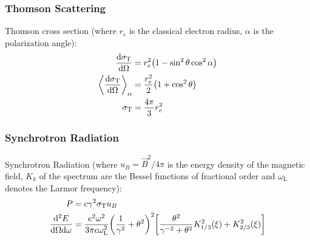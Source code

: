 		\subsubsection{Thomson Scattering}
			Thomson cross section (where $r_e$ is the classical electron radius, $\alpha$ is the polarization angle):
			\begin{equation}
				\begin{aligned}
					\dv{\sigma_\text{T}}{\Omega} &= r_e^2 \qty(1-\sin^2 \theta \cos^2 \alpha) \\
					\left\langle \dv{\sigma_\text{T}}{\Omega} \right\rangle_{\alpha} &= \frac{r_e^2}{2} \qty(1+\cos^2 \theta) \\
					\sigma_\text{T} &= \frac{4\pi}{3}r_e^2 \\
				\end{aligned}
			\end{equation}

		\subsubsection{Synchrotron Radiation}
			\noindent
			Synchrotron Radiation (where $u_B=\vec{B}^2/4\pi$ is the energy density of the magnetic field, $K_k$ of the spectrum are the Bessel functions of fractional order and $\omega_\text{L}$ denotes the Larmor frequency):
			\begin{equation}
				\begin{aligned}
					P &= c \gamma^2 \sigma_\text{T} u_B \\
					\frac{\dd^2 E}{\dd\Omega\dd\omega} &= \frac{e^2 \omega^2}{3\pi c\omega_\text{L}^2} \qty(\frac{1}{\gamma^2} + \theta^2)^2\qty[\frac{\theta^2}{\gamma^{-2}+\theta^2} K_{1/3}^2(\xi) + K_{2/3}^2(\xi)]\\
				\end{aligned}
			\end{equation}

